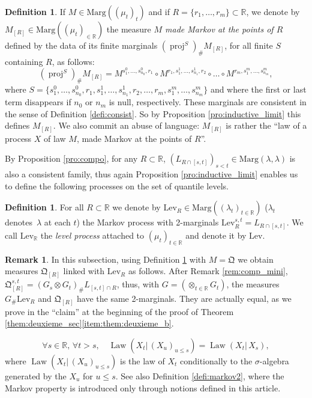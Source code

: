 \documentclass[10pt,a4paper]{article}
\theoremstyle{plain}
\theoremstyle{definition}
\newtheorem{defi}[them]{Definition}
\newtheorem{rem}[them]{Remark}
\newcommand{\como}{\mathfrak{Q}}
\newcommand{\lev}{\mathrm{Lev}}
\newcommand{\la}{\lambda}
\newcommand{\ma}{\mathrm{Marg}}
\newcommand{\R}{\mathbb{R}}
\newcommand{\law}{\operatorname{Law}}
\newcommand{\pr}{\operatorname{proj}}
\begin{document}
\begin{defi}\label{defi:quantile_discretement_markovien} If $M\in\ma((\mu_t)_t)$ and if $R=\{r_1,\ldots,r_m\}\subset\R$, we denote by $M_{[R]}\in\ma((\mu_t)_{\in\R})$ the measure \emph{$M$ made Markov at the points of $R$} defined by the data of its finite marginals $(\pr^{S})_\# M_{[R]}$, for all finite $S$ containing $R$, as follows:
\[(\pr^{S})_\# M_{[R]}= M^{s^0_1,\ldots, s^0_{n_0},r_1}\circ M^{r_1,s^1_{1},\ldots,s^1_{n_1},r_2}\circ\ldots\circ M^{r_m,s^m_{1},\ldots,s^m_{n_m}},\]
where $S=\{s^0_1,\ldots, s^0_{n_0},r_1,s^1_{1},\ldots,s^1_{n_1},r_2,\ldots,r_m,s^m_{1},\ldots,s^m_{n_m}\}$ and where the first or last term disappears if $n_0$ or $n_m$ is null, respectively. These marginals are consistent in the sense of Definition \ref{defi:consist}. So by Proposition \ref{pro:inductive_limit} this defines $M_{[R]}$. We also commit an abuse of language: $M_{[R]}$ is rather the ``law of a process $X$ of law $M$, made Markov at the points of $R$''.
\end{defi}

By Proposition \ref{pro:compo}, for any $R\subset\R$, $(L_{R\cap[s,t]})_{s<t}\in \ma(\la,\la)$ is also a consistent family, thus again Proposition \ref{pro:inductive_limit} enables us to define the following processes on the set of quantile levels.

\begin{defi}\label{defi:lev}
For all $R\subset\R$ we denote by $\lev_R\in\ma((\la_t)_{t\in\R})$ ($\la_t$ denotes~$\la$ at each $t$) the Markov process with 2-marginals $\lev_R^{s,t}=L_{R\cap[s,t]}$. We call $\lev_\R$ the \emph{level process} attached to $(\mu_t)_{t\in \R}$ and denote it by $\lev$.
\end{defi}

\begin{rem}\label{rem:mini_et_Q}In this subsection, using Definition \ref{defi:quantile_discretement_markovien} with $M=\como$ we obtain measures $\como_{[R]}$ linked with $\lev_R$ as follows. After Remark \ref{rem:comp_mini}, $\como_{[R]}^{s,t}=(G_s\otimes G_t)_\#L_{[s,t]\cap R}$, thus, with $G=(\otimes_{t\in \R} G_{t})$, the measures $G_\#\lev_R$ and $\como_{[R]}$ have the same 2-marginals. They are actually equal, as we prove in the ``claim'' at the beginning of the proof of Theorem \ref{them:deuxieme_sec}\eqref{item:them:deuxieme_b}.
\end{rem}

\begin{equation}\label{eq:def_markovien}
\forall s\in\R,\,\forall t>s,\quad \law(X_t|\,(X_{u})_{u\leqslant s})=\law(X_t|\,X_s),
\end{equation}
where $\law(X_t|\,(X_u)_{u\leq s})$ is the law of $X_t$ conditionally to the $\sigma$-algebra generated by the $X_u$ for $u\leq s$. See also Definition \ref{defi:markov2}, where the Markov property is introduced only through notions defined in this article.
\end{document}
